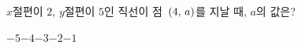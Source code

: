 $x$절편이 $2$, $y$절편이 $5$인 직선이 점~$(4,\mkern3mu a)$를 지날 때, $a$의 값은?
\begin{choices32}{$-5$}{$-4$}{$-3$}{$-2$}{$-1$}\end{choices32}
